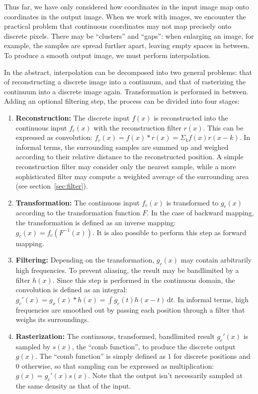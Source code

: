 \documentclass[english,12pt]{ifimaster}
\begin{document}
Thus far, we have only considered how coordinates in the input image
map onto coordinates in the output image. When we work with images, we
encounter the practical problem that continuous coordinates may not
map precisely onto discrete pixels. There may be ``clusters'' and
``gaps'': when enlarging an image, for example, the samples are spread
further apart, leaving empty spaces in between. To produce a smooth
output image, we must perform interpolation.

In the abstract, interpolation can be decomposed into two general
problems: that of reconstructing a discrete image into a continuum,
and that of rasterizing the continuum into a discrete image again.
Transformation is performed in between. Adding an optional filtering
step, the process can be divided into four stages:
\begin{enumerate}
\item \textbf{Reconstruction:} The discrete input $f(x)$ is
  reconstructed into the continuous input $f_c(x)$ with the
  reconstruction filter $r(x)$. This can be expressed as convolution:
  $f_c(x) = f(x) * r(x) = \Sigma_{k} f(x) r(x - k)$. In informal
  terms, the surrounding samples are summed up and weighed according
  to their relative distance to the reconstructed position. A simple
  reconstruction filter may consider only the nearest sample, while a
  more sophisticated filter may compute a weighted average of the
  surrounding area (see section~\ref{sec:filter}).
\item \textbf{Transformation:} The continuous input $f_c(x)$ is
  transformed to $g_c(x)$ according to the transformation function
  $F$. In the case of backward mapping, the transformation is defined
  as an inverse mapping: $g_c(x) = f_c(F^{-1}(x))$. It is also
  possible to perform this step as forward mapping.
\item \textbf{Filtering:} Depending on the transformation, $g_c(x)$
  may contain arbitrarily high frequencies. To prevent aliasing, the
  result may be bandlimited by a filter $h(x)$. Since this step is
  performed in the continuous domain, the convolution is defined as an
  integral: $g_c'(x) = g_x(x) * h(x) = \int g_c(t) h(x -
  t)\,\mathrm{d}t$. In informal terms, high frequencies are smoothed
  out by passing each position through a filter that weighs its
  surroundings.
\item \textbf{Rasterization:} The continuous, transformed, bandlimited
  result $g_c'(x)$ is sampled by $s(x)$, the ``comb function'', to
  produce the discrete output $g(x)$. The ``comb function'' is simply
  defined as $1$ for discrete positions and $0$ otherwise, so that
  sampling can be expressed as multiplication: $g(x) = g_c'(x)s(x)$.
  Note that the output isn't necessarily sampled at the same density
  as that of the input.
\end{enumerate}
\end{document}

